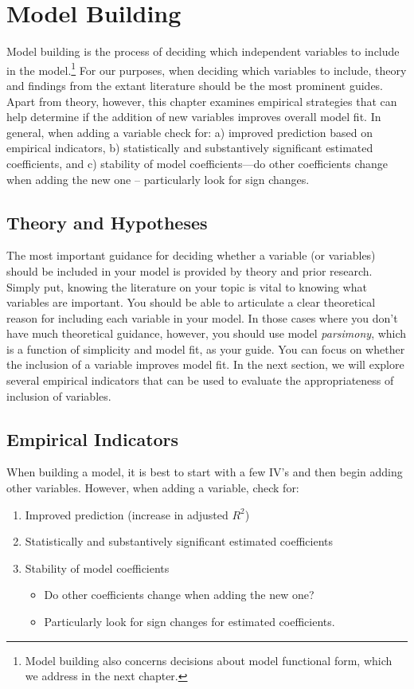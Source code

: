 \documentclass[11pt,openany]{book}\usepackage[]{graphicx}\usepackage[]{color}
\begin{document}
{\section{Model Building}

Model building is the process of deciding which independent variables to include in the model.\footnote{Model building also concerns decisions about model functional form, which we address in the next chapter.} For our purposes, when deciding which variables to include, theory and findings from the extant literature should be the most prominent guides. Apart from theory, however, this chapter examines empirical strategies that can help determine if the addition of new variables improves overall model fit. In general, when adding a variable check for: a) improved prediction based on empirical indicators, b) statistically and substantively significant estimated coefficients, and c) stability of model coefficients---do other coefficients change when adding the new one -- particularly look for sign changes.  

\subsection{Theory and Hypotheses}

The most important guidance for deciding whether a variable (or variables) should be included in your model is provided by theory and prior research. Simply put, knowing the literature on your topic is vital to knowing what variables are important. You should be able to articulate a clear theoretical reason for including each variable in your model. In those cases where you don't have much theoretical guidance, however, you should use model \textit{parsimony}, which is a function of simplicity and model fit, as your guide. You can focus on whether the inclusion of a variable improves model fit.  In the next section, we will explore several empirical indicators that can be used to evaluate the appropriateness of inclusion of variables. 

\subsection{Empirical Indicators}

When building a model, it is best to start with a few IV's and then begin adding other variables. However, when adding a variable, check for: 
\begin{enumerate}
\item Improved prediction (increase in adjusted $R^2$)
\item Statistically and substantively significant estimated coefficients
\item Stability of model coefficients
  \begin{itemize}
\item Do other coefficients change when adding the new one?
\item Particularly look for sign changes for estimated coefficients.
  \end{itemize}
  \end{enumerate}

}
\end{document}
